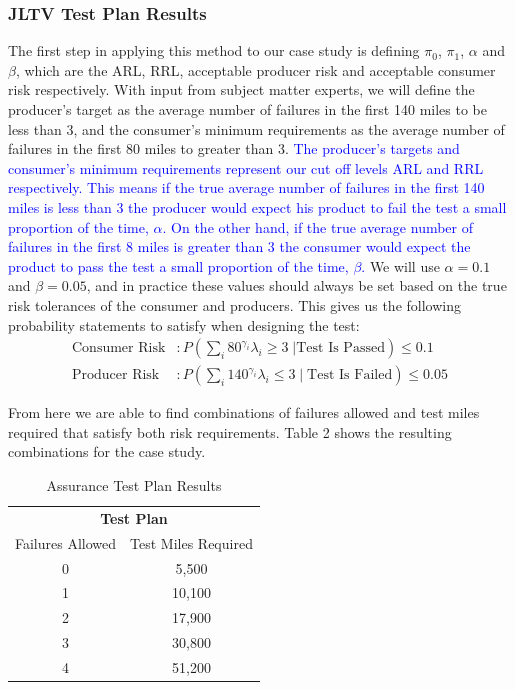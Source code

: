 \documentclass[12pt]{article}
\begin{document}
\subsubsection{JLTV Test Plan Results}
The first step in applying this method to our case study is defining $\pi_0$,
$\pi_1$, $\alpha$ and $\beta$, which are the ARL, RRL, acceptable producer risk
and acceptable consumer risk respectively.  With input from subject matter
experts,  we will define the producer's target as the average number of
failures in the first 140 miles to be less than 3, and the consumer's minimum
requirements as the average number of failures in the first 80 miles to
greater than 3. \textcolor{blue}{The producer's targets and consumer's minimum requirements represent our cut off levels ARL and RRL respectively.  This means if the true average number of failures in the first 140 miles is less than 3 the producer would expect his product to fail the test a small proportion of the time, $\alpha$.  On the other hand, if the true average number of failures in the first 8 miles is greater than 3 the consumer would expect the product to pass the test a small proportion of the time, $\beta$. } We will use $\alpha = 0.1$ and $\beta = 0.05$, and in practice these values should always be set based on
the true risk tolerances of the consumer and producers.  This gives us the
following probability statements to satisfy when designing the test:
\\
$$
\begin{aligned}
  \text{Consumer Risk} &: P(\sum_i 80^{\gamma_i} \lambda_i \geq 3 \; \vert \text{Test Is Passed}) \leq 0.1  \\
  \text{Producer Risk} &: P(\sum_i 140^{\gamma_i} \lambda_i \leq 3 \; \vert \; \text{Test Is Failed}) \leq 0.05
\end{aligned}
$$

From here we are able to find combinations of failures allowed and test miles
required that satisfy both risk requirements.  Table 2 shows the
resulting combinations for the case study.

\begin{table}[h]
\center
\begin{tabular}{|c|c|}
\multicolumn{2}{c}{\textbf{Test Plan}} \\
\cline{1-2}
Failures Allowed    & Test Miles Required \\
\hline
0   & 5,500     \\
1   & 10,100    \\
2   & 17,900    \\
3   & 30,800    \\
4   & 51,200    \\
\hline
\end{tabular}
\caption{Assurance Test Plan Results}
\label{table:ta}
\end{table}
\end{document}
